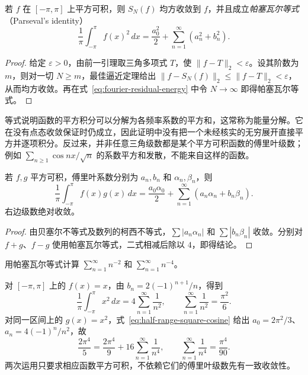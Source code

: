 \begin{theorem}[傅里叶级数的均方收敛与帕塞瓦尔等式]
\label{thm:fourier-mean-square-and-parseval}
若 $f$ 在 $[-\pi,\pi]$ 上平方可积，则 $S_N(f)$ 均方收敛到 $f$，并且成立\emph{帕塞瓦尔等式}（Parseval's identity）
\begin{equation}
    \frac1\pi\int_{-\pi}^{\pi}f(x)^2\,dx
       =\frac{a_0^2}{2}+\sum_{n=1}^\infty(a_n^2+b_n^2).
    \label{eq:parseval-fourier-identity}
\end{equation}
\end{theorem}

\begin{proof}
给定 $\varepsilon>0$，由前一引理取三角多项式 $T$，使 $\|f-T\|_2<\varepsilon$。设其阶数为 $m$，则对一切 $N\geq m$，最佳逼近定理给出 $\|f-S_N(f)\|_2\leq\|f-T\|_2<\varepsilon$，从而均方收敛。再在式~\eqref{eq:fourier-residual-energy} 中令 $N\to\infty$ 即得帕塞瓦尔等式。
\end{proof}

等式说明函数的平方积分可以分解为各频率系数的平方和，这常称为能量分解。它在没有点态收敛保证时仍成立，因此证明中没有把一个未经核实的无穷展开直接平方并逐项积分。反过来，并非任意三角级数都是某个平方可积函数的傅里叶级数；例如 $\sum_{n\geq1}\cos nx/\sqrt n$ 的系数平方和发散，不能来自这样的函数。

\begin{corollary}[广义帕塞瓦尔等式]
\label{cor:generalized-parseval-fourier}
若 $f,g$ 平方可积，傅里叶系数分别为 $a_n,b_n$ 和 $\alpha_n,\beta_n$，则
\begin{equation}
    \frac1\pi\int_{-\pi}^{\pi}f(x)g(x)\,dx
       =\frac{a_0\alpha_0}{2}
            +\sum_{n=1}^\infty(a_n\alpha_n+b_n\beta_n).
    \label{eq:generalized-parseval-fourier}
\end{equation}
右边级数绝对收敛。
\end{corollary}

\begin{proof}
由贝塞尔不等式及数列的柯西不等式，$\sum|a_n\alpha_n|$ 和 $\sum|b_n\beta_n|$ 收敛。分别对 $f+g$、$f-g$ 使用帕塞瓦尔等式，二式相减后除以 $4$，即得结论。
\end{proof}

\begin{example}
\label{ex:parseval-sums-second-fourth-powers}
用帕塞瓦尔等式计算 $\sum_{n=1}^\infty n^{-2}$ 和 $\sum_{n=1}^\infty n^{-4}$。
\end{example}

\begin{solve}
对 $[-\pi,\pi]$ 上的 $f(x)=x$，由 $b_n=2(-1)^{n+1}/n$，得到
\[
    \frac1\pi\int_{-\pi}^{\pi}x^2\,dx
       =4\sum_{n=1}^\infty\frac1{n^2},
    \qquad \sum_{n=1}^\infty\frac1{n^2}=\frac{\pi^2}{6}.
\]
对同一区间上的 $g(x)=x^2$，式~\eqref{eq:half-range-square-cosine} 给出 $a_0=2\pi^2/3$、$a_n=4(-1)^n/n^2$，故
\[
    \frac{2\pi^4}{5}=\frac{2\pi^4}{9}
                   +16\sum_{n=1}^\infty\frac1{n^4},
    \qquad \sum_{n=1}^\infty\frac1{n^4}=\frac{\pi^4}{90}.
\]
两次运用只要求相应函数平方可积，不依赖它们的傅里叶级数先有一致收敛性。
\end{solve}

